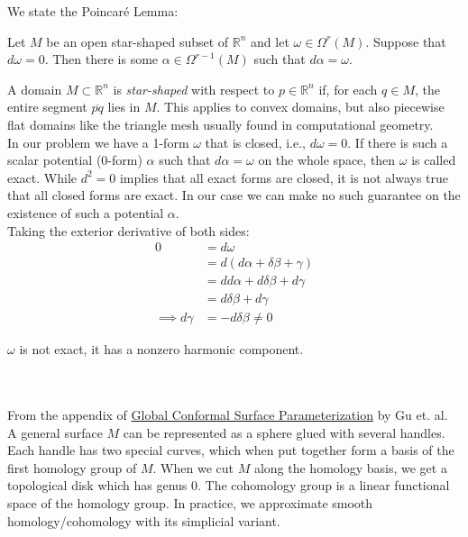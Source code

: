 \documentclass{article}
\def\R{\mathbb{R}}
\def\R{\mathbb{R}}
\begin{document}
We state the Poincaré Lemma:
\begin{mdframed}
    Let $M$ be an open star-shaped subset of $\R^n$ and let $\omega \in \Omega^r(M)$.
    Suppose that $d\omega = 0$. Then there is some $\alpha \in \Omega^{r-1}(M)$ such that $d\alpha = \omega$.
\end{mdframed}
A domain $M \subset \R^n$ is \emph{star-shaped} with respect to $p \in \R^n$ if, for each $q \in M$, the
entire segment $\overline{pq}$ lies in $M$. This applies to convex domains, but also piecewise flat domains like
the triangle mesh usually found in computational geometry. \\

In our problem we have a 1-form $\omega$ that is closed, i.e., $d\omega = 0$. If there is such a scalar potential (0-form)
$\alpha$ such that $d\alpha = \omega$ on the whole space, then $\omega$ is called exact. While $d^2=0$ 
implies that all exact forms are closed, it is not always true that all closed forms
are exact. In our case we can make no such guarantee on the existence of such a potential $\alpha$. \\

Taking the exterior derivative of both sides:
\begin{align*}
    0 &= d\omega \\
        &= d(d\alpha + \delta\beta + \gamma) \tag*{Helmholtz-Hodge Decomposition} \\
        &= dd\alpha + d\delta\beta + d\gamma \\
        &= d\delta\beta + d\gamma \tag*{$d^2 = 0$} \\
    \implies d\gamma &= -d\delta\beta \neq 0
\end{align*}

$\omega$ is not exact, it has a nonzero harmonic component. 


\vspace{1.8cm}
\\\\


From the appendix of \href{https://www.cs.jhu.edu/~misha/ReadingSeminar/Papers/Gu03.pdf}{Global Conformal Surface Parameterization}
by Gu et. al.\\

A general surface $M$ can be represented as a sphere glued with several handles. Each handle has two special curves,
which when put together form a basis of the first homology group of $M$. When we cut $M$ along the homology basis, we get
a topological disk which has genus 0. The cohomology group is a linear functional space of the homology group.
In practice, we approximate smooth homology/cohomology with its simplicial variant. \\
\end{document}
